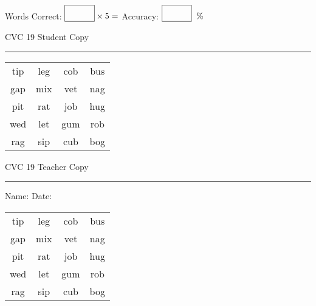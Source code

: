 \documentclass{memoir}
\begin{document}
\normalsize

Words Correct: $\fbox{\phantom{\huge 100}} \times 5 = $ Accuracy: $\fbox{\phantom{\huge 100}}\;\; \%$ 

\vfill

\newpage


\footnotesize \noindent
CVC 19 \hfill Student Copy
\smallskip
\hrule

\huge

\setlength{\tabcolsep}{14pt}
\def\arraystretch{2}

{\selectfont


\begin{vplace}[0.5]
\begin{center}
\begin{tabular}{cccc}
tip & leg & cob & bus \\
gap & mix & vet & nag \\
pit & rat & job & hug \\
wed & let & gum  & rob \\
rag & sip & cub & bog \\
\end{tabular}
\end{center}
\end{vplace}

}

\newpage

\footnotesize \noindent
CVC 19 \hfill Teacher Copy
\smallskip
\hrule

\normalsize

\vfill

\noindent
Name: \underline{\hspace{1.75in}} \hfill Date: \underline{\hspace{1in}}

\huge

{\selectfont


\begin{vplace}[0.5]
\begin{center}
\begin{tabular}{cccc}
tip & leg & cob & bus \\
gap & mix & vet & nag \\
pit & rat & job & hug \\
wed & let & gum  & rob \\
rag & sip & cub & bog \\
\end{tabular}
\end{center}
\end{vplace}



}
\end{document}
